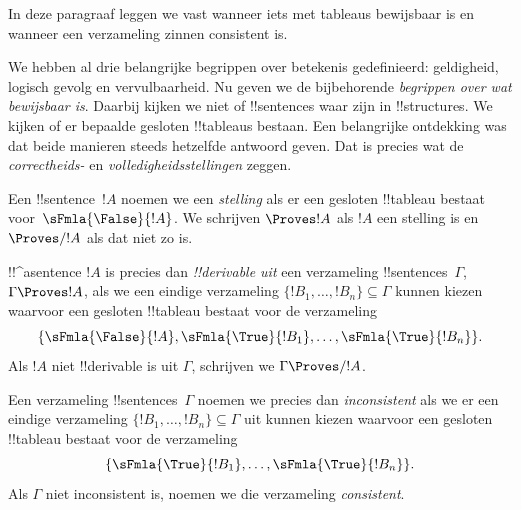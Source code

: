\documentclass[../../../include/open-logic-section]{subfiles}
\begin{document}
      {}
      {}
      

\begin{editorial}
In deze paragraaf leggen we vast wanneer iets met tableaus bewijsbaar
is en wanneer een verzameling zinnen consistent is.
\end{editorial}

\begin{explain}
We hebben al drie belangrijke begrippen over betekenis gedefinieerd:
geldigheid, logisch gevolg en vervulbaarheid. Nu geven we de
bijbehorende \emph{begrippen over wat bewijsbaar is}. Daarbij kijken we
niet of !!{sentence}s waar zijn in !!{structure}s. We kijken of er
bepaalde gesloten !!{tableau}s bestaan. Een belangrijke ontdekking was
dat beide manieren steeds hetzelfde antwoord geven. Dat is precies wat
de \emph{correctheids-} en \emph{volledigheidsstellingen} zeggen.
\end{explain}


\begin{defn}[Stellingen]
Een !!{sentence}~$!A$ noemen we een \emph{stelling} als er een gesloten
!!{tableau} bestaat voor~$\sFmla{\False}{!A}$. We schrijven
$\Proves !A$ als $!A$ een stelling is en $\Proves/ !A$ als dat niet
zo is.
\end{defn}

\begin{defn}[!!^{derivability}]
!!^a{sentence} $!A$ is precies dan \emph{!!{derivable} uit} een
verzameling !!{sentence}s~$\Gamma$, $\Gamma \Proves !A$, als we een
eindige verzameling
$\{!B_1, \dots, !B_n\} \subseteq \Gamma$ kunnen kiezen waarvoor een
gesloten !!{tableau} bestaat voor de verzameling
\[
\{
  \sFmla{\False}{!A},
  \sFmla{\True}{!B_1}, \dots,
  \sFmla{\True}{!B_n}
  \}.
\]
Als $!A$ niet !!{derivable} is uit $\Gamma$, schrijven we
$\Gamma \Proves/ !A$.
\end{defn}

\begin{defn}[Consistentie]
Een verzameling !!{sentence}s~$\Gamma$ noemen we precies dan
\emph{inconsistent} als we er een eindige verzameling
$\{!B_1, \dots, !B_n\} \subseteq \Gamma$ uit kunnen kiezen waarvoor
een gesloten !!{tableau} bestaat voor de verzameling
\[
\{
  \sFmla{\True}{!B_1}, \dots,
  \sFmla{\True}{!B_n}  
  \}.
\]
Als $\Gamma$ niet inconsistent is, noemen we die verzameling
\emph{consistent}.
\end{defn}
\end{document}
